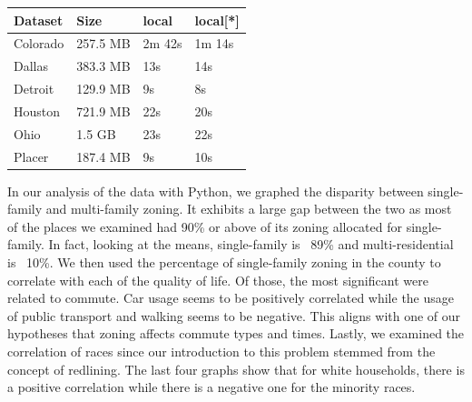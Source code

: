 \documentclass[titlepage]{article}
\begin{document}
\begin{table}[H]
  \centering
  \begin{tabular}{ |p{2cm}|p{2cm}|p{2cm}| p{2cm}| }
  \hline
    Dataset &Size &local &local[*]\\
    \hline
      Colorado & 257.5 MB &2m 42s &1m 14s \\
      Dallas & 383.3 MB &13s &14s \\
      Detroit &129.9 MB &9s &8s \\
      Houston &721.9 MB &22s &20s \\
      Ohio &1.5 GB &23s &22s \\
      Placer &187.4 MB &9s &10s \\
    \hline
  \end{tabular}
  \end{table}

In our analysis of the data with Python, we graphed the disparity between single-family and multi-family zoning. It exhibits a large gap between the two as most of the places we examined had 90\% or above of its zoning allocated for single-family. In fact, looking at the means, single-family is ~89\% and multi-residential is ~10\%. We then used the percentage of single-family zoning in the county to correlate with each of the quality of life. Of those, the most significant were related to commute. Car usage seems to be positively correlated while the usage of public transport and walking seems to be negative. This aligns with one of our hypotheses that zoning affects commute types and times. Lastly, we examined the correlation of races since our introduction to this problem stemmed from the concept of redlining. The last four graphs show that for white households, there is a positive correlation while there is a negative one for the minority races.
\end{document}
